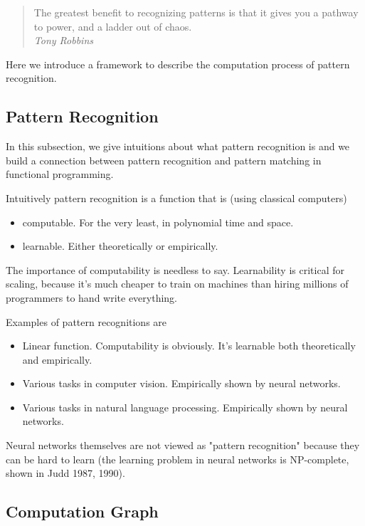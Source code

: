 \documentclass[../main.tex]{subfiles}
\begin{document}
\begin{quote}
The greatest benefit to recognizing patterns is that it gives you a pathway to power, and a ladder out of chaos. \\
\emph{Tony Robbins}
\end{quote}


Here we introduce a framework to describe the computation process of pattern recognition.

\subsection{Pattern Recognition}

In this subsection, we give intuitions about what pattern recognition is and we build a connection between pattern recognition and pattern matching in functional programming.

Intuitively pattern recognition is a function that is (using classical computers)
\begin{itemize}
	\item computable. For the very least, in polynomial time and space.
	\item learnable. Either theoretically or empirically.
\end{itemize}

The importance of computability is needless to say. Learnability is critical for scaling, because it's much cheaper to train on machines than hiring millions of programmers to hand write everything.

Examples of pattern recognitions are

\begin{itemize}
	\item Linear function. Computability is obviously. It's learnable both theoretically and empirically.
	\item Various tasks in computer vision. Empirically shown by neural networks.
	\item Various tasks in natural language processing. Empirically shown by neural networks.
\end{itemize}

Neural networks themselves are not viewed as "pattern recognition" because they can be hard to learn (the learning problem in neural networks is NP-complete, shown in Judd 1987, 1990).

\subsection{Computation Graph}
\end{document}
